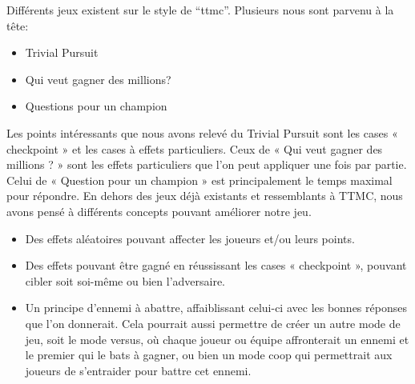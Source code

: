 Différents jeux existent sur le style de ``\acrlong{ttmc}''. Plusieurs nous sont parvenu à la tête:
\begin{itemize}
	\item Trivial Pursuit
	\item Qui veut gagner des millions?
	\item Questions pour un champion
\end{itemize}

Les points intéressants que nous avons relevé du Trivial Pursuit sont les cases « checkpoint » et les cases à effets particuliers. Ceux de « Qui veut gagner des millions ? » sont les effets particuliers que l’on peut appliquer une fois par partie. Celui de « Question pour un champion » est principalement le temps maximal pour répondre. 
\newline
En dehors des jeux déjà existants et ressemblants à TTMC, nous avons pensé à différents concepts pouvant améliorer notre jeu.
\begin{itemize}
	\item Des effets aléatoires pouvant affecter les joueurs et/ou leurs points.
	\item Des effets pouvant être gagné en réussissant les cases « checkpoint », pouvant cibler soit soi-même ou bien l’adversaire.
	\item Un principe d’ennemi à abattre, affaiblissant celui-ci avec les bonnes réponses que l’on donnerait. Cela pourrait aussi permettre de créer un autre mode de jeu, soit le mode versus, où chaque joueur ou équipe affronterait un ennemi et le premier qui le bats à gagner, ou bien un mode coop qui permettrait aux joueurs de s’entraider pour battre cet ennemi.
\end{itemize}